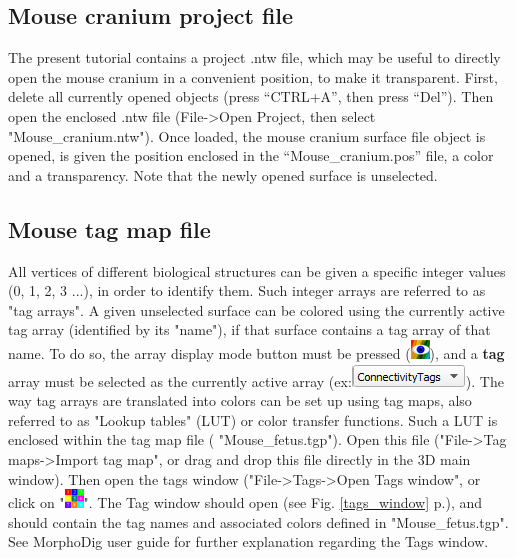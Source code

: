 \documentclass[12pt, a4paper]{book}
\begin{document}
\subsection{Mouse cranium project file}
The present tutorial contains a project .ntw file, which may be useful to directly open the mouse
cranium in a convenient position, to make it transparent. First, delete all currently opened objects
(press “CTRL+A”, then press “Del”). Then open the enclosed .ntw file (File->Open Project, then select
"Mouse\_cranium.ntw"). Once loaded, the mouse cranium surface file object is opened, is given the position
enclosed in the “Mouse\_cranium.pos” file, a color and a transparency. Note that the newly opened
surface is unselected.



\subsection{Mouse tag map file}

All vertices of different biological structures can be given a specific integer values (0, 1, 2, 3 ...), in order to identify them. Such integer arrays are referred to as "tag arrays". A given unselected surface can be colored using the currently active tag array (identified by its "name"), if that surface contains a tag array of that name. To do so, the array display mode button must be pressed (\includegraphics[scale=0.7]{../images/04/show_color_scale.png}), and a \textbf{tag} array must be selected as the currently active array (ex:\includegraphics[scale=0.5]{../images/04/scalarcombo_tag.png}). The way tag arrays are translated into colors can be set up using tag maps, also referred to as "Lookup tables" (LUT) or color transfer functions. Such a LUT is enclosed within the tag map file ( "Mouse\_fetus.tgp"). Open this file ("File->Tag maps->Import tag map", or drag and drop this file directly in the 3D main window). Then open the tags window ("File->Tags->Open Tags window", or click on "\includegraphics[scale=0.7]{../images/04/tag_edit.png}". The Tag window should open (see Fig. \ref{tags_window} p.\pageref{tags_window}), and should contain the tag names and associated colors defined in "Mouse\_fetus.tgp". See MorphoDig user guide for further explanation regarding the Tags window.\\
\end{document}
